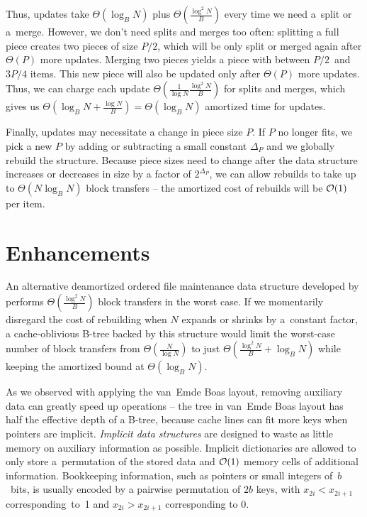 Thus, updates take $\Theta(\log_B N)$ plus $\Theta(\frac{\log^2 N}{B})$
every time we need a~split or a~merge. However, we don't need splits and
merges too often: splitting a full piece creates two pieces of size $P/2$,
which will be only split or merged again after $\Theta(P)$ more updates.
Merging two pieces yields a piece with between $P/2$~and~$3P/4$ items.
This new piece will also be updated only after $\Theta(P)$ more updates.
Thus, we can charge each update $\Theta(\frac{1}{\log N}\frac{\log^2 N}{B})$
for splits and merges, which gives us $\Theta(\log_B N+\frac{\log N}{B})=
\Theta(\log_B N)$ amortized time for updates.

Finally, updates may necessitate a change in piece size $P$. If $P$
no longer fits, we pick a new $P$ by adding or subtracting a small constant
$\Delta_P$ and we globally rebuild the structure.
Because piece sizes need to change after the data structure increases
or decreases in size by a factor of $2^{\Delta_P}$, we can allow
rebuilds to take up to $\Theta(N\log_B N)$ block transfers -- the amortized
cost of rebuilds will be $\mathcal{O}(1)$ per item.

\section{Enhancements}
An alternative deamortized ordered file maintenance data structure
developed by \cite{willard92} performs $\Theta(\frac{\log^2 N}{B})$
block transfers in the worst case. If we momentarily disregard the cost of
rebuilding when $N$ expands or shrinks by a~constant factor, a cache-oblivious
B-tree backed by this structure would limit the worst-case number of block
transfers from $\Theta(\frac{N}{\log N})$ to just
$\Theta(\frac{\log^2 N}{B}+\log_B N)$ while keeping the amortized bound
at $\Theta(\log_B N)$.

As we observed with applying the van~Emde Boas layout, removing auxiliary
data can greatly speed up operations -- the tree in van~Emde Boas layout has
half the effective depth of a B-tree, because cache lines can fit more keys
when pointers are implicit.
\emph{Implicit data structures} are designed to waste as little memory on
auxiliary information as possible. Implicit dictionaries are allowed to only
store a~permutation of the stored data and $\mathcal{O}(1)$ memory cells of additional
information. Bookkeeping information, such as pointers or small integers
of~$b$~bits, is usually encoded by a pairwise permutation of $2b$ keys,
with $x_{2i} < x_{2i+1}$ corresponding~to~1 and $x_{2i} > x_{2i+1}$
corresponding to 0.

